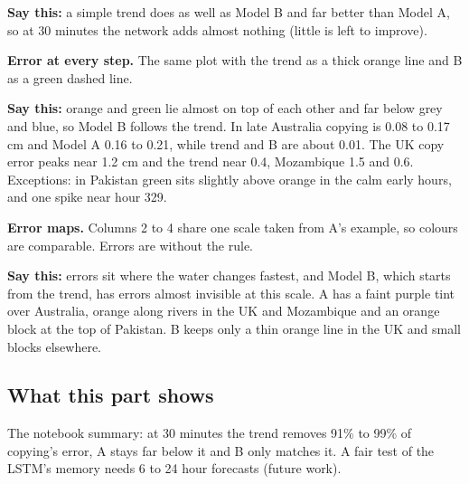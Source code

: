 \textbf{Say this:} a simple trend does as well as Model B and far better than Model A, so at 30 minutes the network adds almost nothing (little is left to improve).

\textbf{Error at every step.} The same plot with the trend as a thick orange line and B as a green dashed line.

\textbf{Say this:} orange and green lie almost on top of each other and far below grey and blue, so Model B follows the trend. In late Australia copying is 0.08 to 0.17 cm and Model A 0.16 to 0.21, while trend and B are about 0.01. The UK copy error peaks near 1.2 cm and the trend near 0.4, Mozambique 1.5 and 0.6. Exceptions: in Pakistan green sits slightly above orange in the calm early hours, and one spike near hour 329.

\textbf{Error maps.} Columns 2 to 4 share one scale taken from A's example, so colours are comparable. Errors are  without the rule.

\textbf{Say this:} errors sit where the water changes fastest, and Model B, which starts from the trend, has errors almost invisible at this scale. A has a faint purple tint over Australia, orange along rivers in the UK and Mozambique and an orange block at the top of Pakistan. B keeps only a thin orange line in the UK and small blocks elsewhere.

\subsection{What this part shows}

The notebook summary: at 30 minutes the trend removes 91\% to 99\% of copying's error, A stays far below it and B only matches it. A fair test of the LSTM's memory needs 6 to 24 hour forecasts (future work).


\fussy
